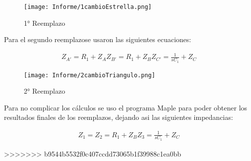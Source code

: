\begin{figure}[h]
	\caption{1° Reemplazo}
	\centering
	\texttt{[image: Informe/1cambioEstrella.png]}
	\label{1reemplazo} 
\end{figure}

Para el segundo reemplazose usaron las siguientes ecuaciones:

\begin{align}

	\begin{equation}
		Z_{A'}= R_1 + Z_{A}
	\end{equation}

	\begin{equation}
		Z_{B'}= R_1 + Z_{B}
	\end{equation}
	
	\begin{equation}
		Z_{C'}= \frac{1}{sC_1} + Z_{C}
	\end{equation}

\end{align}

\begin{figure}[h]
	\caption{2° Reemplazo}
	\centering
	\texttt{[image: Informe/2cambioTriangulo.png]}
	\label{2reemplazo} 
\end{figure}


Para no complicar los cálculos se uso el programa Maple para poder obtener los resultados finales de los reemplazos, dejando asi las siguientes impedancias:

\begin{align}

	\begin{equation}
		Z_{1}= 
	\end{equation}

	\begin{equation}
		Z_{2}= R_1 + Z_{B}
	\end{equation}
	
	\begin{equation}
		Z_{3}= \frac{1}{sC_1} + Z_{C}
	\end{equation}

\end{align}




>>>>>>> b9544b5532f0c407ccdd73065b1f39988c1ea0bb
